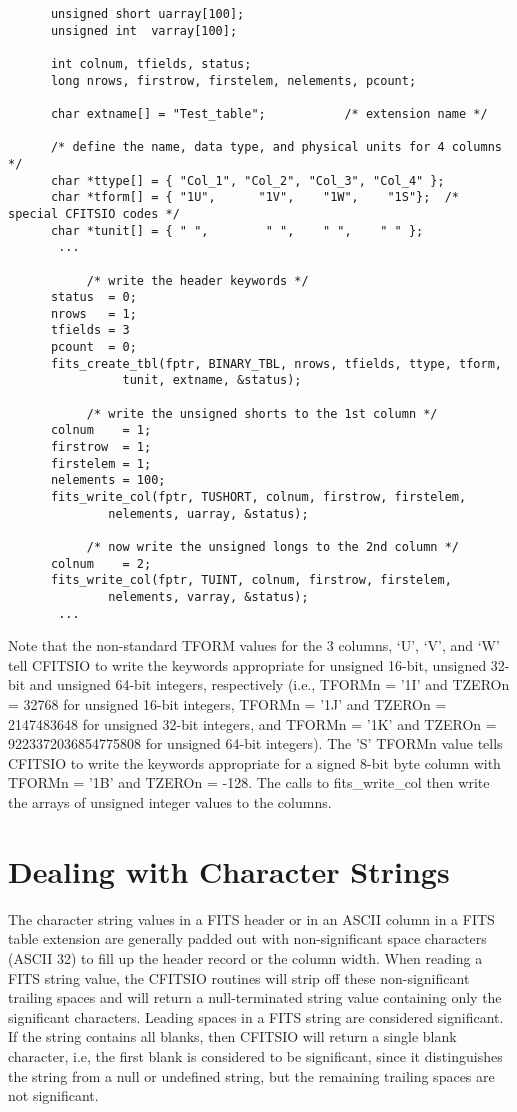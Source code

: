 \documentclass[11pt]{book}
\begin{document}
\begin{verbatim}
      unsigned short uarray[100];
      unsigned int  varray[100];

      int colnum, tfields, status;
      long nrows, firstrow, firstelem, nelements, pcount;

      char extname[] = "Test_table";           /* extension name */

      /* define the name, data type, and physical units for 4 columns */
      char *ttype[] = { "Col_1", "Col_2", "Col_3", "Col_4" };
      char *tform[] = { "1U",      "1V",    "1W",    "1S"};  /* special CFITSIO codes */
      char *tunit[] = { " ",        " ",    " ",    " " };
       ...

           /* write the header keywords */
      status  = 0;
      nrows   = 1;
      tfields = 3
      pcount  = 0;
      fits_create_tbl(fptr, BINARY_TBL, nrows, tfields, ttype, tform,
                tunit, extname, &status);

           /* write the unsigned shorts to the 1st column */
      colnum    = 1;
      firstrow  = 1;
      firstelem = 1;
      nelements = 100;
      fits_write_col(fptr, TUSHORT, colnum, firstrow, firstelem,
              nelements, uarray, &status);

           /* now write the unsigned longs to the 2nd column */
      colnum    = 2;
      fits_write_col(fptr, TUINT, colnum, firstrow, firstelem,
              nelements, varray, &status);
       ...
\end{verbatim}
Note that the non-standard TFORM values for the 3 columns, `U', `V', and `W'
tell CFITSIO to write the keywords appropriate for unsigned 16-bit, unsigned 32-bit and
unsigned 64-bit integers, respectively (i.e., TFORMn = '1I' and TZEROn
= 32768 for unsigned 16-bit integers, TFORMn = '1J' and TZEROn =
2147483648 for unsigned 32-bit integers, and TFORMn = '1K' and TZEROn =
9223372036854775808 for unsigned 64-bit integers).  The 'S' TFORMn value tells
CFITSIO to write the keywords appropriate for a signed 8-bit byte column
with TFORMn = '1B' and TZEROn = -128.  The calls to fits\_write\_col
then write the arrays of unsigned integer values to the columns.


\section{Dealing with Character Strings}

The character string values in a FITS header or in an ASCII column in a
FITS table extension are generally padded out with non-significant
space characters (ASCII 32) to fill up the header record or the column
width.  When reading a FITS string value, the CFITSIO routines will
strip off these non-significant trailing spaces and will return a
null-terminated string value containing only the significant
characters.  Leading spaces in a FITS string are considered
significant.  If the string contains all blanks, then CFITSIO will
return a single blank character, i.e, the first blank is considered to
be significant, since it distinguishes the string from a null or
undefined string, but the remaining trailing spaces are not
significant.
\end{document}
